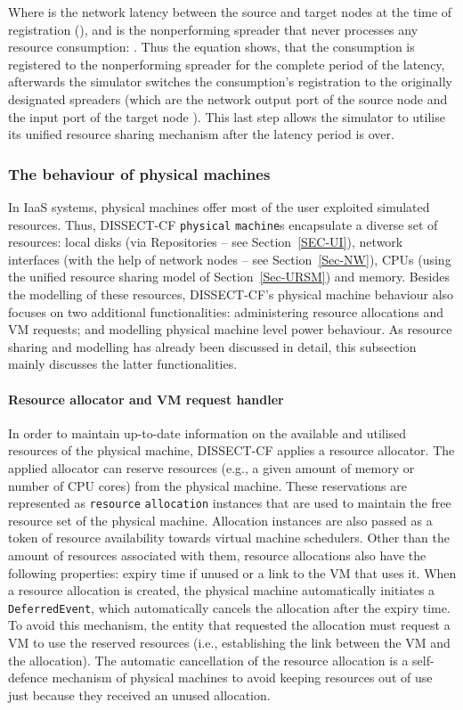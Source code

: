 \documentclass[sort, compress, 5p]{elsarticle}
\begin{document}
Where  is the network latency between the source and target nodes at the time of registration (), and  is the nonperforming spreader that never processes any resource consumption: . Thus the equation shows, that the consumption is registered to the nonperforming spreader for the complete period of the latency, afterwards the simulator switches the consumption's registration to the originally designated spreaders (which are the network output port  of the source node  and the input port  of the target node ). This last step allows the simulator to utilise its unified resource sharing mechanism after the latency period is over.

\subsubsection{The behaviour of physical machines}

In IaaS systems, physical machines offer most of the user exploited simulated resources. Thus, DISSECT-CF \verb+physical+ \verb+machine+s encapsulate a diverse set of resources: local disks (via Repositories -- see Section~\ref{SEC-UI}), network interfaces (with the help of network nodes -- see Section~\ref{Sec-NW}), CPUs (using the unified resource sharing model of Section~\ref{Sec-URSM}) and memory. Besides the modelling of these resources, DISSECT-CF's physical machine behaviour also focuses on two additional functionalities: administering resource allocations and VM requests; and modelling physical machine level power behaviour. As resource sharing and modelling has already been discussed in detail, this subsection mainly discusses the latter functionalities.

\paragraph{Resource allocator and VM request handler} In order to maintain up-to-date information on the available and utilised resources of the physical machine, DISSECT-CF applies a resource allocator. The applied allocator can reserve resources (e.g., a given amount of memory or number of CPU cores) from the physical machine. These reservations are represented as \verb+resource+ \verb+allocation+ instances that are used to maintain the free resource set of the physical machine. Allocation instances are also passed as a token of resource availability towards virtual machine schedulers. Other than the amount of resources associated with them, resource allocations also have the following properties: expiry time if unused or a link to the VM that uses it. When a resource allocation is created, the physical machine automatically initiates a \verb+DeferredEvent+, which automatically cancels the allocation after the expiry time. To avoid this mechanism, the entity that requested the allocation must request a VM to use the reserved resources (i.e., establishing the link between the VM and the allocation). The automatic cancellation of the resource allocation is a self-defence mechanism of physical machines to avoid keeping resources out of use just because they received an unused allocation.
\end{document}
